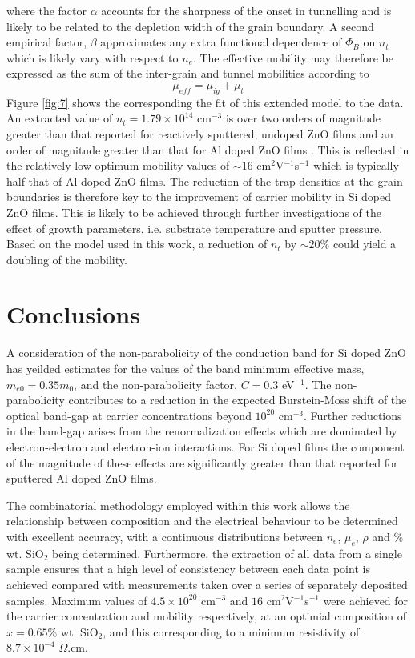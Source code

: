 \documentclass[aps,prl,preprint,showpacs,showkeys, linenumbers]{revtex4-1}
\begin{document}
where the factor $\alpha$ accounts for the sharpness of the onset in tunnelling and is likely to be related to the depletion width of the grain boundary. A second empirical factor, $\beta$ approximates any extra functional dependence of $\Phi_B$ on $n_t$ which is likely vary with respect to $n_e$. The effective mobility may therefore be expressed as the sum of the inter-grain and tunnel mobilities according to
\begin{equation}
\label{eqn:14}
\mu_{eff} = \mu_{ig}+\mu_{t}
\end{equation}
Figure \ref{fig:7} shows the corresponding the fit of this extended model to the data. An extracted value of $n_t = 1.79\times10^{14}$ cm$^{-3}$ is over two orders of magnitude greater than that reported for reactively sputtered, undoped ZnO films \cite{Carcia2003} and an order of magnitude greater than that for Al doped ZnO films \cite{Shigesato2003}. This is reflected in the relatively low optimum mobility values of $\sim16$ cm$^{2}$V$^{-1}$s$^{-1}$ which is typically half that of Al doped ZnO films. The reduction of the trap densities at the grain boundaries is therefore key to the improvement of carrier mobility in Si doped ZnO films. This is likely to be achieved through further investigations of the effect of growth parameters, i.e. substrate temperature and sputter pressure. Based on the model used in this work, a reduction of $n_t$ by $\sim20\%$ could yield a doubling of the mobility.


\section{Conclusions}
\label{sec:4}
A consideration of the non-parabolicity of the conduction band for Si doped ZnO has yeilded estimates for the values of the band minimum effective mass, $m_{e0} =0.35m_0$, and the non-parabolicity factor, $C=0.3$ eV$^{-1}$. The non-parabolicity contributes to a reduction in the expected Burstein-Moss shift of the optical band-gap at carrier concentrations beyond $10^{20}$ cm$^{-3}$. Further reductions in the band-gap arises from the renormalization effects which are dominated by electron-electron and electron-ion interactions. For Si doped films the component of the magnitude of these effects are significantly greater than that reported for sputtered Al doped ZnO films.

The combinatorial methodology employed within this work allows the relationship between composition and the electrical behaviour to be determined with excellent accuracy, with a continuous distributions between $n_e$, $\mu_e$, $\rho$ and $\%$ wt. SiO$_{2}$ being determined. Furthermore, the extraction of all data from a single sample ensures that a high level of consistency between each data point is achieved compared with measurements taken over a series of separately deposited samples. Maximum values of $4.5\times10^{20}$ cm$^{-3}$ and $16$ cm$^{2}$V$^{-1}$s$^{-1}$ were achieved for the carrier concentration and mobility respectively, at an optimial composition of $x =0.65\%$ wt. SiO$_2$, and this corresponding to a minimum resistivity of $8.7\times10^{-4}$ $\Omega$.cm.
\end{document}
